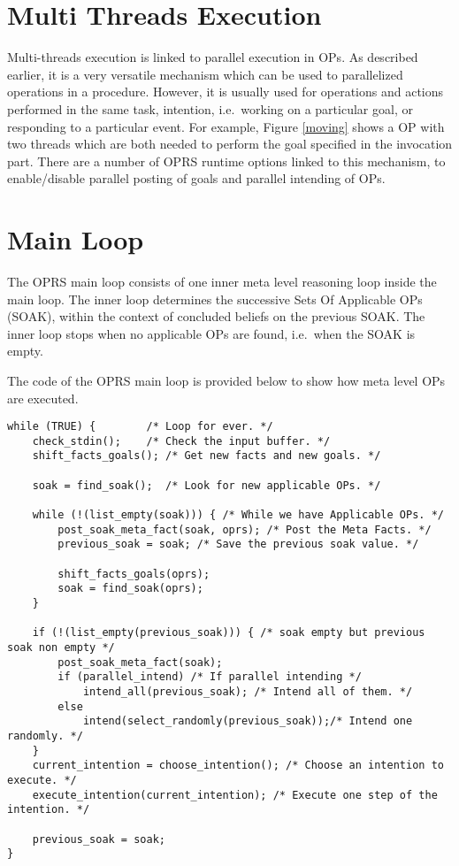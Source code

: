 \section{Multi Threads Execution}


Multi-threads execution is linked to parallel execution in OPs. As
described earlier, it is a very versatile mechanism which can be used to
parallelized operations in a procedure. However, it is usually used for
operations and actions performed in the same task, intention, i.e.\ working on a
particular goal, or responding to a particular event. For example, Figure
\ref{moving} shows a OP with two threads which are both needed to perform the
goal specified in the invocation part. There are a number of OPRS runtime
options linked to this mechanism, to enable/disable parallel posting of goals
and parallel intending of OPs.

\section{\CPK{} Main Loop}

The OPRS main loop consists of one inner meta level reasoning loop
inside the main loop. The inner loop determines
the successive Sets Of Applicable OPs (SOAK), within the context of
concluded beliefs on the previous SOAK. The inner loop stops when no
applicable OPs are found, i.e.\  when the SOAK is empty.

The code of the OPRS main loop is provided below to show how meta level OPs are 
executed.

\begin{verbatim}
while (TRUE) {        /* Loop for ever. */
    check_stdin();    /* Check the input buffer. */
    shift_facts_goals(); /* Get new facts and new goals. */

    soak = find_soak();  /* Look for new applicable OPs. */

    while (!(list_empty(soak))) { /* While we have Applicable OPs. */
        post_soak_meta_fact(soak, oprs); /* Post the Meta Facts. */
        previous_soak = soak; /* Save the previous soak value. */

        shift_facts_goals(oprs);
        soak = find_soak(oprs);
    }

    if (!(list_empty(previous_soak))) { /* soak empty but previous soak non empty */
        post_soak_meta_fact(soak);
        if (parallel_intend) /* If parallel intending */
            intend_all(previous_soak); /* Intend all of them. */
        else
            intend(select_randomly(previous_soak));/* Intend one randomly. */
    }
    current_intention = choose_intention(); /* Choose an intention to execute. */
    execute_intention(current_intention); /* Execute one step of the intention. */

    previous_soak = soak;
}
\end{verbatim}

